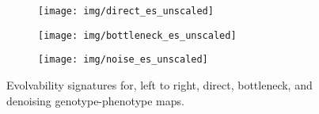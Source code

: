 \begin{figure}
        \begin{subfigure}[b]{0.33\linewidth}
                \texttt{[image: img/direct\_es\_unscaled]}
        \end{subfigure}%
        \begin{subfigure}[b]{0.33\linewidth}
                \texttt{[image: img/bottleneck\_es\_unscaled]}
        \end{subfigure}%
        \begin{subfigure}[b]{0.33\linewidth}
                \texttt{[image: img/noise\_es\_unscaled]}
        \end{subfigure}
        \caption{Evolvability signatures for, left to right, direct, bottleneck, and denoising genotype-phenotype maps.}\label{fig:all_es}
\end{figure}

